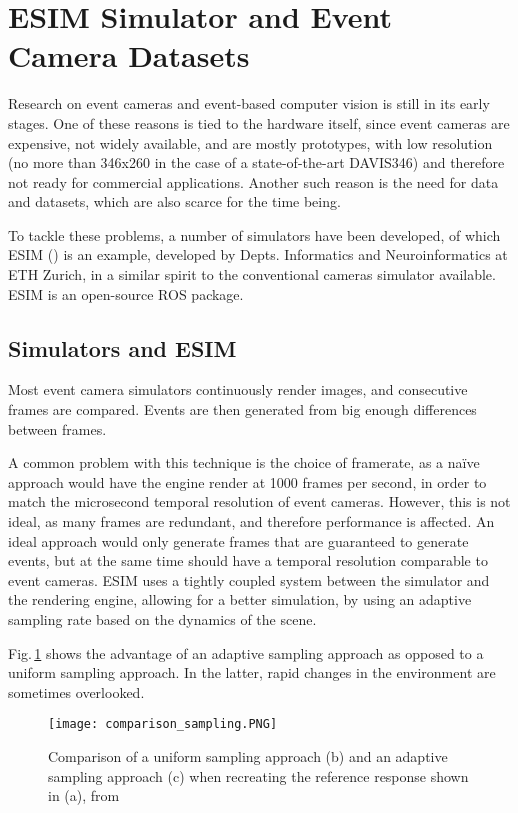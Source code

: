 \section{ESIM Simulator and Event Camera Datasets}
\label{sec:esim_dataset}

Research on event cameras and event-based computer vision is still in its early stages. One of these reasons is tied to the hardware itself, since event cameras are expensive, not widely available, and are mostly prototypes, with low resolution (no more than 346x260 in the case of a state-of-the-art DAVIS346) and therefore not ready for commercial applications. Another such reason is the need for data and datasets, which are also scarce for the time being.
    
To tackle these problems, a number of simulators have been developed, of which ESIM (\cite{rebecq2018esim}) is an example, developed by Depts. Informatics and Neuroinformatics at ETH Zurich, in a similar spirit to the  conventional cameras simulator available. ESIM is an open-source ROS package.

\subsection{Simulators and ESIM}

Most event camera simulators continuously render images, and consecutive frames are compared. Events are then generated from big enough differences between frames.

A common problem with this technique is the choice of framerate, as a naïve approach would have the engine render at 1000 frames per second, in order to match the microsecond temporal resolution of event cameras. However, this is not ideal, as many frames are redundant, and therefore performance is affected. An ideal approach would only generate frames that are guaranteed to generate events, but at the same time should have a temporal resolution comparable to event cameras. ESIM uses a tightly coupled system between the simulator and the rendering engine, allowing for a better simulation, by using an adaptive sampling rate based on the dynamics of the scene.

Fig.\,\ref{fig:sec2_comparison_sampling} shows the advantage of an adaptive sampling approach as opposed to a uniform sampling approach. In the latter, rapid changes in the environment are sometimes overlooked.

\begin{figure}[ht]
    \centering
    \texttt{[image: comparison\_sampling.PNG]}
    \caption[Comparison of sampling approaches for the simulator]{Comparison of a uniform sampling approach (b) and an adaptive sampling approach (c) when recreating the reference response shown in (a), from \cite{rebecq2018esim}}
    \label{fig:sec2_comparison_sampling}
\end{figure}

